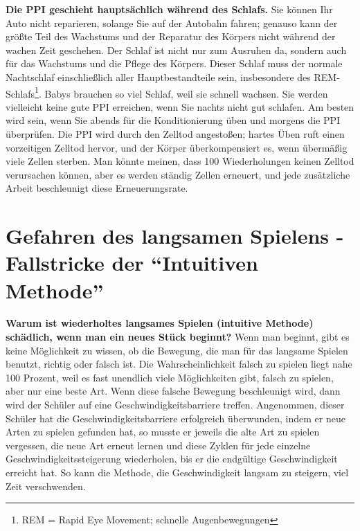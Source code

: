 \textbf{Die PPI geschieht hauptsächlich während des Schlafs.}
Sie können Ihr Auto nicht reparieren, solange Sie auf der Autobahn fahren; genauso kann der größte Teil des Wachstums und der Reparatur des Körpers nicht während der wachen Zeit geschehen.
Der Schlaf ist nicht nur zum Ausruhen da, sondern auch für das Wachstums und die Pflege des Körpers.
Dieser Schlaf muss der normale Nachtschlaf einschließlich aller Hauptbestandteile sein, insbesondere des REM-Schlafs\footnote{REM = Rapid Eye Movement; schnelle Augenbewegungen}.
Babys brauchen so viel Schlaf, weil sie schnell wachsen.
Sie werden vielleicht keine gute PPI erreichen, wenn Sie nachts nicht gut schlafen.
Am besten wird sein, wenn Sie abends für die Konditionierung üben und morgens die PPI überprüfen.
Die PPI wird durch den Zelltod angestoßen; hartes Üben ruft einen vorzeitigen Zelltod hervor, und der Körper überkompensiert es, wenn übermäßig viele Zellen sterben.
Man könnte meinen, dass 100 Wiederholungen keinen Zelltod verursachen können, aber es werden ständig Zellen  erneuert, und jede zusätzliche Arbeit beschleunigt diese Erneuerungsrate.


\section{Gefahren des langsamen Spielens - Fallstricke der \enquote{Intuitiven Methode}}\hypertarget{c1ii16}{}

\textbf{Warum ist wiederholtes langsames Spielen (intuitive Methode) schädlich, wenn man ein neues Stück beginnt?}
Wenn man beginnt, gibt es keine Möglichkeit zu wissen, ob die Bewegung, die man für das langsame Spielen benutzt, richtig oder falsch ist.
Die Wahrscheinlichkeit falsch zu spielen liegt nahe 100 Prozent, weil es fast unendlich viele Möglichkeiten gibt, falsch zu spielen, aber nur eine beste Art.
Wenn diese falsche Bewegung beschleunigt wird, dann wird der Schüler auf eine Geschwindigkeitsbarriere treffen.
Angenommen, dieser Schüler hat die Geschwindigkeitsbarriere erfolgreich überwunden, indem er neue Arten zu spielen gefunden hat, so musste er jeweils die alte Art zu spielen vergessen, die neue Art erneut lernen und diese Zyklen für jede einzelne Geschwindigkeitssteigerung wiederholen, bis er die endgültige Geschwindigkeit erreicht hat.
So kann die Methode, die Geschwindigkeit langsam zu steigern, viel Zeit verschwenden.

